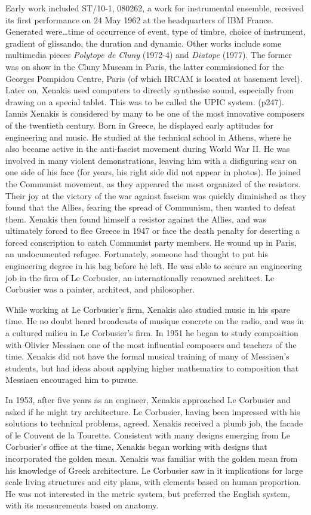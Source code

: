 Early work included ST/10-1, 080262, a work for instrumental ensemble, received its first performance on 24 May 1962 at the headquarters of IBM France.  Generated were…time of occurrence of event, type of timbre, choice of instrument, gradient of glissando, the duration and dynamic. Other works include some multimedia pieces \textit{Polytope de Cluny} (1972-4) and \textit{Diatope} (1977).  The former was on show in the Cluny Museam in Paris, the latter commissioned for the Georges Pompidou Centre, Paris (of which IRCAM is located at basement level).  Later on, Xenakis used computers to directly synthesise sound, especially from drawing on a special tablet.  This was to be called the UPIC system. (p247).
Iannis Xenakis is considered by many to be one of the most innovative composers of the twentieth century. Born in Greece, he displayed early aptitudes for engineering and music. He studied at the technical school in Athens, where he also became active in the anti-fascist movement during World War II. He was involved in many violent demonstrations, leaving him with a disfiguring scar on one side of his face (for years, his right side did not appear in photos). He joined the Communist movement, as they appeared the most organized of the resistors. Their joy at the victory of the war against fascism was quickly diminished as they found that the Allies, fearing the spread of Communism, then wanted to defeat them. Xenakis then found himself a resistor against the Allies, and was ultimately forced to flee Greece in 1947 or face the death penalty for deserting a forced conscription to catch Communist party members.
He wound up in Paris, an undocumented refugee. Fortunately, someone had thought to put his engineering degree in his bag before he left. He was able to secure an engineering job in the firm of Le Corbusier, an internationally renowned architect. Le Corbusier was a painter, architect, and philosopher.

While working at Le Corbusier's firm, Xenakis also studied music in his spare time. He no doubt heard broadcasts of musique concrete on the radio, and was in a cultured milieu in Le Corbusier's firm. In 1951 he began to study composition with Olivier Messiaen one of the most influential composers and teachers of the time. Xenakis did not have the formal musical training of many of Messiaen's students, but had ideas about applying higher mathematics to composition that Messiaen encouraged him to pursue.

In 1953, after five years as an engineer, Xenakis approached Le Corbusier and asked if he might try architecture. Le Corbusier, having been impressed with his solutions to technical problems, agreed. Xenakis received a plumb job, the facade of le Couvent de la Tourette. Consistent with many designs emerging from Le Corbusier's office at the time, Xenakis began working with designs that incorporated the golden mean. Xenakis was familiar with the golden mean from his knowledge of Greek architecture. Le Corbusier saw in it implications for large scale living structures and city plans, with elements based on human proportion. He was not interested in the metric system, but preferred the English system, with its measurements based on anatomy. 

